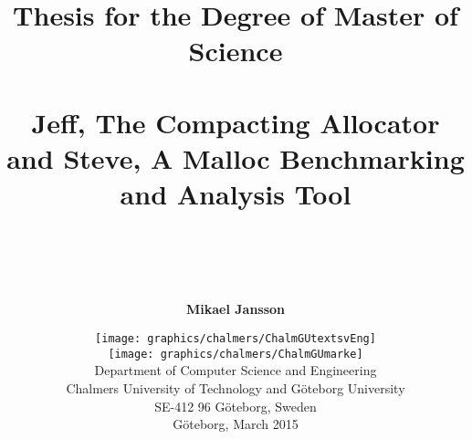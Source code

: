 \begin{titlepage}
\thispagestyle{empty}

\title{{\Large Thesis for the Degree of Master of Science}
     \\ ~
     \\ \bf Jeff, The Compacting Allocator and Steve, A Malloc Benchmarking and Analysis Tool
     \\ ~
     \\ ~
      }

\author{\Large \bf Mikael Jansson}

\date{
  \enlargethispage{2.1\baselineskip}
  \texttt{[image: graphics/chalmers/ChalmGUtextsvEng]} \\
  \vspace{5mm}
  \texttt{[image: graphics/chalmers/ChalmGUmarke]} \\
  \vspace{12mm}
  Department of Computer Science and Engineering \\
  Chalmers University of Technology
    and G\"{o}teborg University \\
  SE-412 96 G\"{o}teborg, Sweden \\
  \vspace{12mm}
  G{\"o}teborg, March 2015
}

\end{titlepage}

\maketitle

\newpage{}
\thispagestyle{empty}
\mbox{}

\noindent

